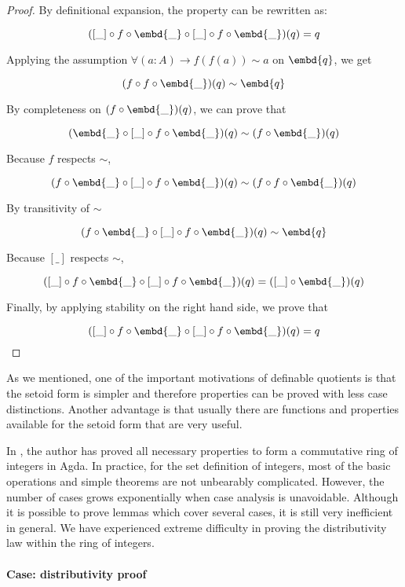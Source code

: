 \begin{proof}
By definitional expansion, the property can be rewritten as:

$$([\_] \circ f \circ \embd{\_} \circ [\_] \circ f \circ \embd{\_})(q) = q$$

Applying the assumption $\forall (a : A) \to f (f (a)) \sim a$ on $\embd{q}$, we get

$$(f \circ f \circ \embd{\_}) (q) \sim \embd{q}$$

By completeness on $(f \circ \embd{\_}) (q)$, we can prove that

$$ (\embd{\_} \circ [\_] \circ f \circ \embd{\_}) (q) \sim  (f \circ \embd{\_}) (q) $$

Because $f$ respects $\sim$,

$$ (f \circ \embd{\_} \circ [\_] \circ  f \circ \embd{\_}) (q) \sim  (f \circ f \circ \embd{\_}) (q) $$

By transitivity of $\sim$

$$(f \circ \embd{\_} \circ [\_] \circ  f \circ \embd{\_}) (q) \sim \embd{q}$$


Because $[\_]$ respects $\sim$,


$$([\_] \circ f \circ \embd{\_} \circ [\_] \circ f \circ \embd{\_}) (q) = ([\_] \circ \embd{\_})(q)$$

Finally, by applying stability on the right hand side, we prove that


$$([\_] \circ f \circ \embd{\_} \circ [\_] \circ f \circ \embd{\_})(q) = q$$
\end{proof}


As we mentioned, one of the important motivations of definable quotients is that the setoid form is simpler and therefore properties can be proved with less case distinctions. Another advantage is that usually there are functions and properties available for the setoid form that are very useful. 

In \cite{finalyear}, the author has proved all necessary properties to form a commutative ring of integers in Agda.
In practice, for the set definition of integers, most of the basic operations and simple theorems are not unbearably complicated. However, the number of
cases grows exponentially when case analysis is unavoidable.
Although it is possible to prove lemmas which cover several cases, it is still very inefficient in general. 
We have experienced extreme difficulty in proving the distributivity law within the ring of integers.

\paragraph{Case: distributivity proof}

